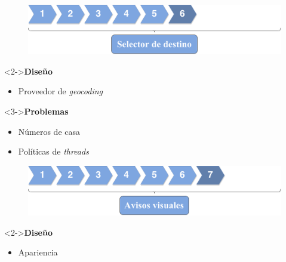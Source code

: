 \begin{slide}
  \begin{center}
    \begin{figure}[!h]
      \includegraphics[height=0.27\textheight]{img/ite6.png}
    \end{figure}
    \vspace{0.5cm}
    \begin{minipage}[b]{0.4\linewidth}
      \begin{block}<2->{\textbf{Diseño}}
        \begin{itemize}
          \item Proveedor de \emph{geocoding}
        \end{itemize}
      \end{block}
    \end{minipage}
    \hspace{0.5cm}
    \begin{minipage}[b]{0.4\linewidth}
      \begin{block}<3->{\textbf{Problemas}}
        \begin{itemize}
          \item Números de casa
          \item Políticas de \emph{threads}
        \end{itemize}
      \end{block}
    \end{minipage}
  \end{center}
\end{slide}

\begin{slide}
  \begin{center}
    \begin{figure}[!h]
      \includegraphics[height=0.27\textheight]{img/ite7.png}
    \end{figure}
    \vspace{0.5cm}
    \begin{minipage}[b]{0.4\linewidth}
      \begin{block}<2->{\textbf{Diseño}}
        \begin{itemize}
          \item Apariencia
        \end{itemize}
      \end{block}
    \end{minipage}
  \end{center}
\end{slide}

